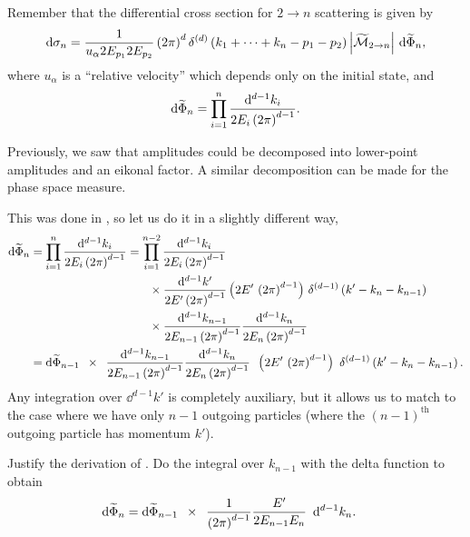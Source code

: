 Remember that the differential cross section for \(2 \to n\) scattering is given by
\begin{align}
    \dd \sigma_n
    =
    \frac{1}{u_\alpha 2 E_{p_1} 2 E_{p_2}} \left(2\pi\right)^d
    \delta^{(d)}\left(k_1 + \cdots + k_n - p_1 - p_2\right)
    \left|
        \widetilde{\mathcal{M}}_{2 \to n}
    \right|
    \,
    \dd\widetilde{\Phi}_n
    ,
\end{align}
where \(u_\alpha\) is a ``relative velocity'' which depends only on the initial state, and
\begin{align}
    \dd\widetilde\Phi_n
    =
    \prod_{i=1}^n
    \frac{\dd^{d-1}k_i}{2 E_i \left(2\pi\right)^{d-1}}
    .
\end{align}

Previously, we saw that amplitudes could be decomposed into lower-point amplitudes and an eikonal factor.
%
A similar decomposition can be made for the phase space measure.

This was done in , so let us do it in a slightly different way,
\begin{align}
    \dd \widetilde\Phi_n
    &=
    \prod_{i=1}^n
    \frac{\dd^{d-1}k_i}{2 E_i \le(2\pi\ri)^{d-1}}
    =
    \prod_{i=1}^{n-2}
    \frac{\dd^{d-1}k_i}{2 E_i \le(2\pi\ri)^{d-1}}
    \\
    &\qquad\qquad\qquad\qquad\qquad
    \notag
    \times
    \frac{\dd^{d-1}k'}{2 E' \le(2\pi\ri)^{d-1}}
    \le(2 E'\,\le(2\pi\ri)^{d-1}\ri)
    \,
    \delta^{(d-1)}\le(k' - k_n - k_{n-1}\ri)
    \\
    &\qquad\qquad\qquad\qquad\qquad
    \notag
    \times
    \frac{\dd^{d-1}k_{n-1}}{2 E_{n-1} \le(2\pi\ri)^{d-1}}
    \frac{\dd^{d-1}k_n}{2 E_n \le(2\pi\ri)^{d-1}}
    \\
    &=
    \dd\widetilde\Phi_{n-1}
    \,\,\,
    \times
    \,\,\,
    \frac{\dd^{d-1}k_{n-1}}{2 E_{n-1} \le(2\pi\ri)^{d-1}}
    \frac{\dd^{d-1}k_n}{2 E_n \le(2\pi\ri)^{d-1}}
    \,\,\,
    \le(2 E'\,\le(2\pi\ri)^{d-1}\ri)
    \,\,
    \delta^{(d-1)}\le(k' - k_n - k_{n-1}\ri)
    \label{eq:factor_phasespace}
    .
\end{align}
Any integration over \(\dd^{d-1} k'\) is completely auxiliary, but it allows us to match to the case where we have only \(n-1\) outgoing particles (where the \((n-1)^\text{th}\) outgoing particle has momentum \(k'\)).

\begin{exercise*}
    Justify the derivation of .
    Do the integral over \(k_{n-1}\) with the delta function to obtain
    \begin{align}
        \label{eq:phasespace_factorization_2}
        \dd \widetilde\Phi_n
        &=
        \dd\widetilde\Phi_{n-1}
        \,\,\,
        \times
        \,\,\,
        \frac{1}{\le(2\pi\ri)^{d-1}}
        \frac{E'}{2E_{n-1} E_n}
        \,\,\,
        \dd^{d-1}k_n
        .
    \end{align}
\end{exercise*}


